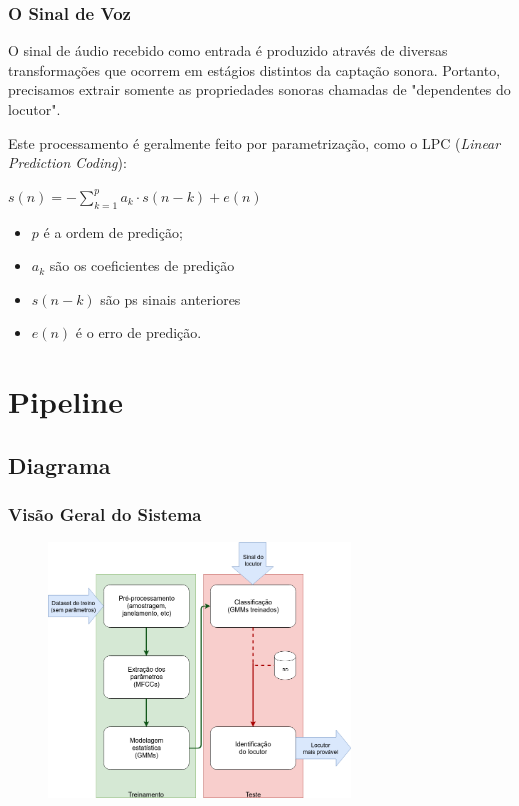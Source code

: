 \documentclass{beamer}
\begin{document}
\begin{frame} %
    \frametitle{O Sinal de Voz}
    
    O sinal de áudio recebido como entrada é produzido através de diversas transformações que ocorrem em estágios distintos da captação sonora.
    Portanto, precisamos extrair somente as propriedades sonoras chamadas de "dependentes do locutor".

    \medskip

    Este processamento é geralmente feito por parametrização, como o LPC (\emph{Linear Prediction Coding}):

    \bigskip

    \begin{math}
        s(n) = - \sum_{k=1}^{p} a_{k} \cdot s(n-k) + e(n)
    \end{math}

    \bigskip

    \begin{itemize}
        \item $p$ é a ordem de predição;

        \item $a_{k}$  são os coeficientes de predição
    
        \item $s(n-k)$ são ps sinais anteriores
    
        \item $e(n)$ é o erro de predição.
    \end{itemize}

    


\end{frame}

\section{Pipeline}

\subsection{Diagrama}

\begin{frame} %
    \frametitle{Visão Geral do Sistema}

    \begin{figure}
        \centering
        \includegraphics[height=192pt]{fig2.png}
    \end{figure}


\end{frame}
\end{document}
